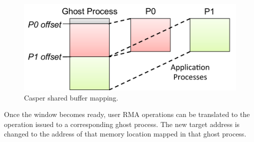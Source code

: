 \begin{figure}
\centering
\includegraphics[width=0.9\columnwidth]{figures/casper/design_mem_map.pdf}
\caption{Casper shared buffer mapping.}
\label{fig:deg-mem-map}
\end{figure}

Once the window becomes ready, user RMA operations can be translated
to the operation issued to a corresponding ghost process. The new
target address is changed to the address of that memory location
mapped in that ghost process.